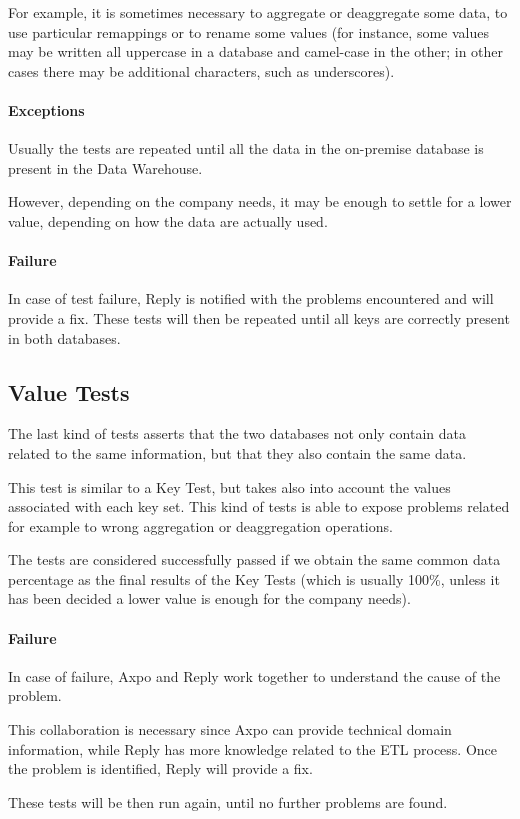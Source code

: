     For example, it is sometimes necessary to aggregate or deaggregate some data, to use particular remappings or to rename some values (for instance, some values may be written all uppercase in a database and camel-case in the other; in other cases there may be additional characters, such as underscores).
    
    \paragraph{Exceptions}
        Usually the tests are repeated until all the data in the on-premise database is present in the Data Warehouse.
        
        However, depending on the company needs, it may be enough to settle for a lower value, depending on how the data are actually used.
    
    \paragraph{Failure}
        In case of test failure, Reply is notified with the problems encountered and will provide a fix.
        These tests will then be repeated until all keys are correctly present in both databases.
        
\subsection{Value Tests}
    The last kind of tests asserts that the two databases not only contain data related to the same information, but that they also contain the same data.
    
    This test is similar to a Key Test, but takes also into account the values associated with each key set.
    This kind of tests is able to expose problems related for example to wrong aggregation or deaggregation operations.
    
    The tests are considered successfully passed if we obtain the same common data percentage as the final results of the Key Tests (which is usually 100\%, unless it has been decided a lower value is enough for the company needs).
    
    \paragraph{Failure}
        In case of failure, Axpo and Reply work together to understand the cause of the problem.
        
        This collaboration is necessary since Axpo can provide technical domain information, while Reply has more knowledge related to the ETL process.
        Once the problem is identified, Reply will provide a fix.
        
        These tests will be then run again, until no further problems are found.
